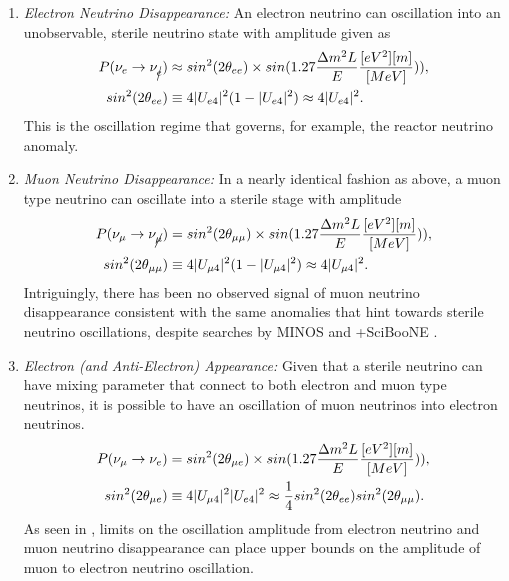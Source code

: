 \begin{enumerate}
  \item{ \em Electron Neutrino Disappearance:} An electron neutrino can oscillation into an unobservable, sterile neutrino state with amplitude given as
  \begin{align}
  P(\nu_{e} \rightarrow \nu_{\cancel{e}}) &\approx sin^2(2 \theta_{ee})\times sin(1.27 \frac{\Delta m^2 L}{E} \frac{[eV^2][m]}{[MeV]})),
   \\
  sin^2(2 \theta_{ee}) &\equiv 4 |U_{e4}|^2 (1 - |U_{e4}|^2) \approx 4 |U_{e4}|^2.
  \end{align}
  This is the oscillation regime that governs, for example, the reactor neutrino anomaly.
  \item { \em Muon Neutrino Disappearance: } In a nearly identical fashion as above, a muon type neutrino can oscillate into a sterile stage with amplitude 
  \begin{align}
  P(\nu_{\mu} \rightarrow \nu_{\cancel{\mu}}) &= sin^2(2 \theta_{\mu\mu})\times sin(1.27 \frac{\Delta m^2 L}{E} \frac{[eV^2][m]}{[MeV]})),
   \\
  sin^2(2 \theta_{\mu\mu}) &\equiv 4 |U_{\mu4}|^2 (1 - |U_{\mu4}|^2) \approx 4 |U_{\mu 4}|^2.
  \end{align}
  Intriguingly, there has been no observed signal of muon neutrino disappearance consistent with the same anomalies that hint towards sterile neutrino oscillations, despite searches by MINOS \cite{MINOS} and \MB+SciBooNE \cite{miniboone_sciboone}.

  \item { \em Electron (and Anti-Electron) Appearance:} Given that a sterile neutrino can have mixing parameter that connect to both electron and muon type neutrinos, it is possible to have an oscillation of muon neutrinos into electron neutrinos.
  \begin{align}
  P(\nu_{\mu} \rightarrow \nu_{e}) &= sin^2(2 \theta_{\mu e})\times sin(1.27 \frac{\Delta m^2 L}{E} \frac{[eV^2][m]}{[MeV]})),
   \\
  sin^2(2 \theta_{\mu e}) &\equiv 4 |U_{\mu4}|^2|U_{e4}|^2 \approx \frac{1}{4} sin^2(2 \theta_{ee}) sin^2(2 \theta_{\mu \mu}).
  \end{align}
  As seen in \cite{giunti_constraint,other_constraint}, limits on the oscillation amplitude from electron neutrino and muon neutrino disappearance can place upper bounds on the amplitude of muon to electron neutrino oscillation.
\end{enumerate}

